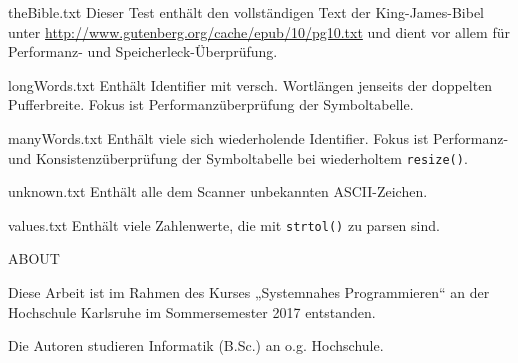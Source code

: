 \documentclass[
a4paper,   %
11pt,      %
oneside,   %
onecolumn, %
final      %
]{article}
\newcommand{\code}[1]{\lstinline$#1$}
\begin{document}
\begin{description}
\item{theBible.txt} Dieser Test enthält den vollständigen Text der King-James-Bibel unter \url{http://www.gutenberg.org/cache/epub/10/pg10.txt} und dient vor allem für Performanz- und Speicherleck-Überprüfung.

\item{longWords.txt} Enthält Identifier mit versch. Wortlängen jenseits der doppelten Pufferbreite. Fokus ist Performanzüberprüfung der Symboltabelle.

\item{manyWords.txt} Enthält viele sich wiederholende Identifier. Fokus ist Performanz- und Konsistenzüberprüfung der Symboltabelle bei wiederholtem \code{resize()}.

\item{unknown.txt} Enthält alle dem Scanner unbekannten ASCII-Zeichen.

\item{values.txt} Enthält viele Zahlenwerte, die mit \code{strtol()} zu parsen sind.

\end{description}






\appendix


\begin{description}
\item{ABOUT}
    \begin{description}
    \item{Diese Arbeit} ist im Rahmen des Kurses „Systemnahes Programmieren“ an der Hochschule Karlsruhe im Sommersemester 2017 entstanden.

    \item{Die Autoren} studieren Informatik (B.Sc.) an o.g. Hochschule.
\end{description}
\end{description}


%
%
\end{document}
